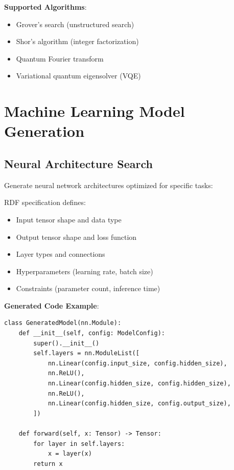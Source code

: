 \textbf{Supported Algorithms}:
\begin{itemize}
    \item Grover's search (unstructured search)
    \item Shor's algorithm (integer factorization)
    \item Quantum Fourier transform
    \item Variational quantum eigensolver (VQE)
\end{itemize}

\section{Machine Learning Model Generation}

\subsection{Neural Architecture Search}

Generate neural network architectures optimized for specific tasks:

\begin{definition}
    RDF specification defines:
    \begin{itemize}
        \item Input tensor shape and data type
        \item Output tensor shape and loss function
        \item Layer types and connections
        \item Hyperparameters (learning rate, batch size)
        \item Constraints (parameter count, inference time)
    \end{itemize}
\end{definition}

\textbf{Generated Code Example}:

\begin{verbatim}
class GeneratedModel(nn.Module):
    def __init__(self, config: ModelConfig):
        super().__init__()
        self.layers = nn.ModuleList([
            nn.Linear(config.input_size, config.hidden_size),
            nn.ReLU(),
            nn.Linear(config.hidden_size, config.hidden_size),
            nn.ReLU(),
            nn.Linear(config.hidden_size, config.output_size),
        ])

    def forward(self, x: Tensor) -> Tensor:
        for layer in self.layers:
            x = layer(x)
        return x
\end{verbatim}

